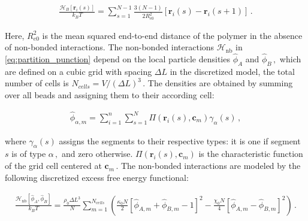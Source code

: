 \documentclass[bachelor,       %
               twoside,        %
               BCOR10mm,       %
               ngerman, english %
               ]{GAUBM}
\begin{document}
\begin{align}
    \frac{\mathcal H_B[\mathbf r_i(s)]}{k_BT}=\sum_{s=1}^{N-1}\frac{3(N-1)}{2R_{e0}^2}[\mathbf r_i(s)-\mathbf r_i(s+1)]\,.
\end{align}

Here, $R_{e0}^2$ is the mean squared end-to-end distance of the polymer in the absence of non-bonded interactions. The non-bonded interactions $\mathcal H_\text{nb}$ in \eqref{eq:partition_punction} depend on the local particle densities $\hat\phi_A$ and $\hat\phi_B\,,$ which are defined on a cubic grid with spacing $\Delta L$ in the discretized model, the total number of cells is $N_{cells}=V/(\Delta L)^3\,.$ The densities are obtained by summing over all beads and assigning them to their according cell:

\begin{align}
    \hat\phi_{\alpha,m}=\sum_{i=1}^n\sum_{s=1}^N\Pi(\mathbf r_i(s),\mathbf c_m)\gamma_\alpha(s)\,,
    \label{eq:normalized_densities}
\end{align}

where $\gamma_\alpha(s)$ assigns the segments to their respective types: it is one if segment $s$ is of type $\alpha\,,$ and zero otherwise. $\Pi(\mathbf r_i(s),\mathbf c_m)$ is the characteristic function of the grid cell centered at $\mathbf c_m\,.$ The non-bonded interactions are modeled by the following discretized excess free energy functional:

\begin{align}
    \frac{\mathcal H_\text{nb}[\hat\phi_A,\hat\phi_B]}{k_BT}=\frac{\rho_0\Delta L^3}{N}\sum_{m=1}^{N_{cells}}\left(\frac{\kappa_0 N}{2}[\hat\phi_{A,m}+\hat\phi_{B,m}-1]^2-\frac{\chi_0 N}{4}[\hat\phi_{A,m}-\hat\phi_{B,m}]^2\right)\,.
    \label{eq:nonbonded_discretized}
\end{align}
\end{document}

